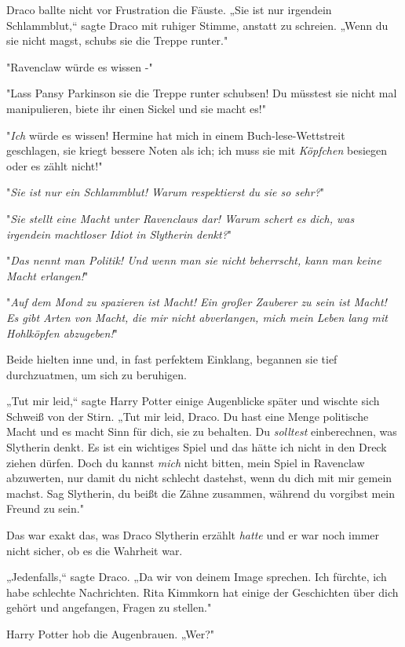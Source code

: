 {Draco ballte nicht vor Frustration die Fäuste. „Sie ist nur irgendein Schlammblut,“ sagte Draco mit ruhiger Stimme, anstatt zu schreien. „Wenn du sie nicht magst, schubs sie die Treppe runter."

"Ravenclaw würde es wissen -"

"Lass Pansy Parkinson sie die Treppe runter schubsen! Du müsstest sie nicht mal manipulieren, biete ihr einen Sickel und sie macht es!"

"\emph{Ich} würde es wissen! Hermine hat mich in einem Buch-lese-Wettstreit geschlagen, sie kriegt bessere Noten als ich; ich muss sie mit \emph{Köpfchen} besiegen oder es zählt nicht!"

"\emph{Sie ist nur ein Schlammblut! Warum respektierst du sie so sehr?}"

"\emph{Sie stellt eine Macht unter Ravenclaws dar! Warum schert es dich, was irgendein machtloser Idiot in Slytherin denkt?}"

"\emph{Das nennt man Politik! Und wenn man sie nicht beherrscht, kann man keine Macht erlangen!}"

"\emph{Auf dem Mond zu spazieren ist Macht! Ein großer Zauberer zu sein ist Macht! Es gibt Arten von Macht, die mir nicht abverlangen, mich mein Leben lang mit Hohlköpfen abzugeben!}"

Beide hielten inne und, in fast perfektem Einklang, begannen sie tief durchzuatmen, um sich zu beruhigen.

„Tut mir leid,“ sagte Harry Potter einige Augenblicke später und wischte sich Schweiß von der Stirn. „Tut mir leid, Draco. Du hast eine Menge politische Macht und es macht Sinn für dich, sie zu behalten. Du \emph{solltest} einberechnen, was Slytherin denkt. Es ist ein wichtiges Spiel und das hätte ich nicht in den Dreck ziehen dürfen. Doch du kannst \emph{mich} nicht bitten, mein Spiel in Ravenclaw abzuwerten, nur damit du nicht schlecht dastehst, wenn du dich mit mir gemein machst. Sag Slytherin, du beißt die Zähne zusammen, während du vorgibst mein Freund zu sein."

Das war exakt das, was Draco Slytherin erzählt \emph{hatte} und er war noch immer nicht sicher, ob es die Wahrheit war.

„Jedenfalls,“ sagte Draco. „Da wir von deinem Image sprechen. Ich fürchte, ich habe schlechte Nachrichten. Rita Kimmkorn hat einige der Geschichten über dich gehört und angefangen, Fragen zu stellen."

Harry Potter hob die Augenbrauen. „Wer?"

}
